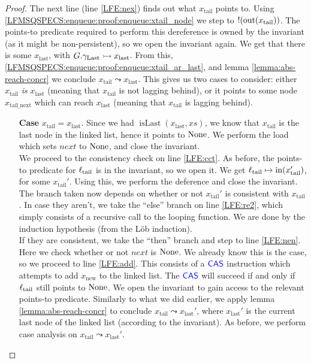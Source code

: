 \documentclass[a4paper, 10pt]{report}
\theoremstyle{definition}
\newcommand{\xsc}{xs}
\newcommand{\isLast}{\operatorname{isLast}}
\newcommand{\locN}[1]{\loc_{\mathrm{#1}}}
\newcommand{\loctail}{\locN{tail}}
\newcommand{\nIn}[1]{\operatorname{in}(#1)}
\newcommand{\nOut}[1]{\operatorname{out}(#1)}
\newcommand{\node}{x}
\newcommand{\nodeN}[1]{\node_{\mathrm{#1}}}
\newcommand{\nodetail}{\nodeN{tail}}
\newcommand{\nodelast}{\nodeN{last}}
\newcommand{\nodenew}{\nodeN{new}}
\newcommand{\nodetailnext}{\nodeN{tail\_next}}
\newcommand{\Qg}{G}
\newcommand{\glast}{\gname_{\mathrm{Last}}}
\newcommand{\reach}[2]{#1 \leadsto #2}
\newcommand{\ap}[2]{#1 \rightarrowtail #2}
\begin{document}
\begin{proof}
  The next line (line \ref{LFE:nex}) finds out what $\nodetail$ points to. Using \ref{LFMSQSPECS:enqueue:proof:enqueue:xtail_node} we step to $\deref (\nOut{\nodetail})$. The points-to predicate required to perform this dereference is owned by the invariant (as it might be non-persistent), so we open the invariant again. We get that there is some $\nodelast$, with $\ap{\Qg.\glast}{\nodelast}$. From this, \ref{LFMSQSPECS:enqueue:proof:enqueue:xtail_ar_last}, and lemma \ref{lemma:abs-reach-concr} we conclude $\reach{\nodetail}{\nodelast}$. This gives us two cases to consider: either $\nodetail$ \textit{is} $\nodelast$ (meaning that $\nodetail$ is not lagging behind), or it points to some node $\nodetailnext$ which can reach $\nodelast$ (meaning that $\nodetail$ is lagging behind).
  \begin{itemize}
    \item[\textbf{Case}]
    $\nodetail = \nodelast$. Since we had $\isLast(\nodelast, \xsc)$, we know that $\nodetail$ is the last node in the linked list, hence it points to $\operatorname{None}$. We perform the load which sets $next$ to $\operatorname{None}$, and close the invariant.\\
    We proceed to the consistency check on line \ref{LFE:cct}. As before, the points-to predicate for $\loctail$ is in the invariant, so we open it. We get $\loctail \mapsto \nIn{\nodetail'}$, for some $\nodetail'$. Using this, we perform the deference and close the invariant. The branch taken now depends on whether or not $\nodetail'$ is consistent with $\nodetail$. In case they aren't, we take the ``else'' branch on line \ref{LFE:re2}, which simply consists of a recursive call to the looping function. We are done by the induction hypothesis (from the Löb induction).\\
    If they are consistent, we take the ``then'' branch and step to line \ref{LFE:nen}. Here we check whether or not $next$ is $\operatorname{None}$. We already know this is the case, so we proceed to line \ref{LFE:add}. This consists of a $\textsf{\color{blue} CAS}$ instruction which attempts to add $\nodenew$ to the linked list. The $\textsf{\color{blue} CAS}$ will succeed if and only if $\loctail$ still points to $\operatorname{None}$. We open the invariant to gain access to the relevant points-to predicate. Similarly to what we did earlier, we apply lemma \ref{lemma:abs-reach-concr} to conclude $\reach{\nodetail}{\nodelast'}$, where $\nodelast'$ is the current last node of the linked list (according to the invariant). As before, we perform case analysis on $\reach{\nodetail}{\nodelast'}$.
    \begin{itemize}

\end{itemize}
\end{itemize}
\end{proof}
\end{document}
